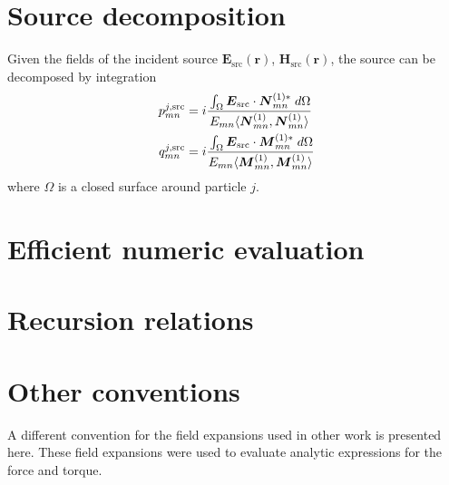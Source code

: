 \documentclass[11pt]{article}
\begin{document}
\section{Source decomposition}
Given the fields of the incident source $\boldsymbol{E}_\text{src}(\boldsymbol{r})$, $\boldsymbol{H}_\text{src}(\boldsymbol{r})$, the source can be decomposed by integration
\begin{align}
\begin{split}
    p_{mn}^{j,\text{src}} &= i\cfrac{\int_\Omega \boldsymbol{E}_\text{src} \cdot \boldsymbol{N}_{mn}^{(1)*} \; d\Omega}
    {E_{mn} \langle \boldsymbol{N}_{mn}^{(1)},\boldsymbol{N}_{mn}^{(1)} \rangle} \\
    q_{mn}^{j,\text{src}} &= i\cfrac{\int_\Omega \boldsymbol{E}_\text{src} \cdot \boldsymbol{M}_{mn}^{(1)*} \; d\Omega}
    {E_{mn} \langle \boldsymbol{M}_{mn}^{(1)},\boldsymbol{M}_{mn}^{(1)} \rangle}
\end{split}
\end{align}
where $\Omega$ is a closed surface around particle $j$.

\section{Efficient numeric evaluation}
\section{Recursion relations}

\section{Other conventions}
A different convention for the field expansions used in other work \cite{barton1989theoretical} is presented here.
These field expansions were used to evaluate analytic expressions for the force and torque.
\newline
\end{document}
